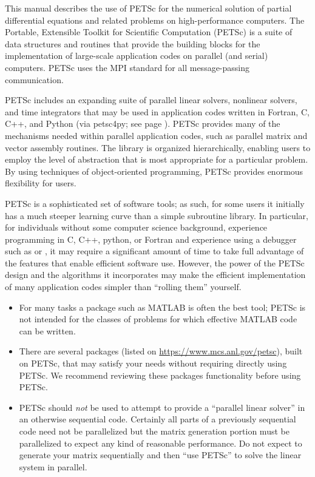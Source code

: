 
%
%

\medskip \medskip
This manual describes the use of PETSc for the numerical solution
of partial differential equations and related problems
on high-performance computers.  The
Portable, Extensible Toolkit for Scientific Computation (PETSc) is a
suite of data structures and routines that provide the building
blocks for the implementation of large-scale application codes on parallel
(and serial) computers.  PETSc uses the MPI standard for all
message-passing communication.

PETSc includes an expanding suite of parallel linear solvers, nonlinear
solvers, and time integrators that may be
used in application codes written in Fortran, C, C++, and Python (via petsc4py; see page \pageref{petsc4py}).  PETSc
provides many of the mechanisms needed within parallel application
codes, such as parallel matrix and vector assembly routines. The library is
organized hierarchically, enabling users to employ the level of
abstraction that is most appropriate for a particular problem. By
using techniques of object-oriented programming, PETSc provides
enormous flexibility for users.

PETSc is a sophisticated set of software tools; as such, for some
users it initially has a much steeper learning curve than a simple
subroutine library. In particular, for individuals without some
computer science background, experience programming in C, C++, python, or Fortran and experience using a debugger such as  or , it
may require a significant amount of time to take full advantage of the
features that enable efficient software use.  However, the power of
the PETSc design and the algorithms it incorporates may make the efficient
implementation of many application codes simpler than ``rolling
them'' yourself.
\begin{itemize}
\item  For many tasks a package such as MATLAB is often the best tool; PETSc is not
intended for the classes of problems for which effective MATLAB code
can be written.
\item There are several packages (listed on \href{https://www.mcs.anl.gov/petsc}{https://www.mcs.anl.gov/petsc}),
built on PETSc, that may satisfy your needs without requiring directly using PETSc. We recommend reviewing these packages
functionality before using PETSc.
\item PETSc should {\em not} be used to attempt to provide
a ``parallel linear solver'' in an otherwise sequential code.
Certainly all parts of a previously sequential code need not be parallelized but the
matrix generation portion must be parallelized to expect any kind of reasonable performance.
Do not expect to generate your matrix sequentially and then ``use PETSc'' to solve
the linear system in parallel.
\end{itemize}

